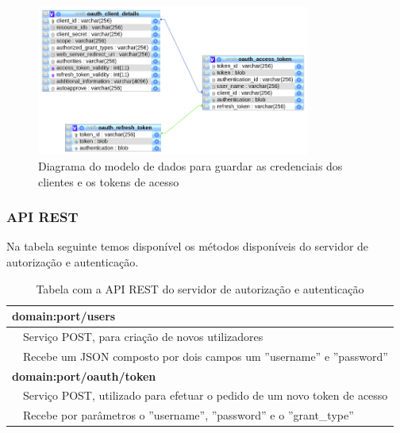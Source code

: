  \begin{figure}[H]
  \centering
  \includegraphics[width=0.8\textwidth]{imgs/auth-diagram.png}
  \caption[Diagrama do modelo de dados para guardar as credenciais dos clientes e os tokens de acesso]{Diagrama do modelo de dados para guardar as credenciais dos clientes e os tokens de acesso}
  
  \label{f:auth-diagram}
\end{figure}

\subsubsection{API REST}
Na tabela seguinte temos disponível os métodos disponíveis do servidor de autorização e autenticação.
\begin{table}[H]
\label{t:apirest-auth}
\centering
\begin{tabularx}{1\textwidth}{|p{0.3cm} p{14.4cm}|}
\multicolumn{2}{l}{\textbf{domain:port/users}}  \\ \hline 
 & Serviço POST, para criação de novos utilizadores \\
 & Recebe um JSON composto por dois campos um ''username'' e ''password'' \\ \hline
\multicolumn{2}{l}{\textbf{domain:port/oauth/token}} \\ \hline
 & Serviço POST, utilizado para efetuar o pedido de um novo token de acesso \\
 & Recebe por parâmetros o ''username'', ''password'' e o ''grant\_type'' \\ \hline
\end{tabularx}
\caption{Tabela com a API REST do servidor de autorização e autenticação}
\end{table}

